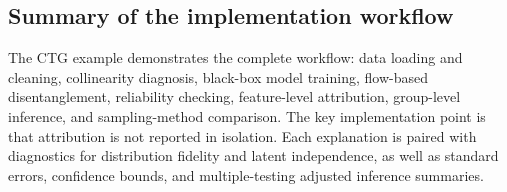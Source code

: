 \subsection{Summary of the implementation workflow}

The CTG example demonstrates the complete  workflow: data loading and
cleaning, collinearity diagnosis, black-box model training, flow-based
disentanglement, reliability checking, feature-level attribution,
group-level inference, and sampling-method comparison. The key implementation
point is that attribution is not reported in isolation. Each explanation is
paired with diagnostics for distribution fidelity and latent independence, as
well as standard errors, confidence bounds, and multiple-testing adjusted
inference summaries.
